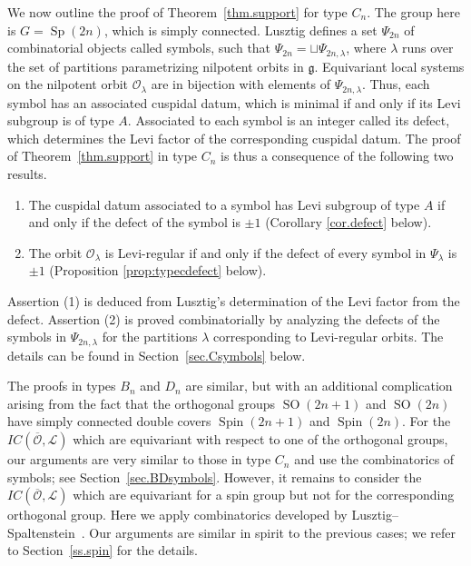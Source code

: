\documentclass[reqno,11pt]{amsart}
\theoremstyle{remark}
\theoremstyle{remark}
\theoremstyle{definition}
\theoremstyle{definition}
\theoremstyle{definition}
\numberwithin{equation}{section}
\newcommand{\SO}{\operatorname{SO}}
\newcommand{\Sp}{\operatorname{Sp}}
\newcommand{\Spin}{\operatorname{Spin}}
\newcommand{\fg}{{\mathfrak g}}
\newcommand{\gl}{\lambda}
\newcommand{\cl}{\mathcal{L}}
\newcommand{\co}{\mathcal{O}}
\begin{document}
We now outline the proof of Theorem~\ref{thm.support} for type $C_n$.
The group here is $G = \Sp(2n)$, which is simply connected. Lusztig defines a set $\Psi_{2n}$ of combinatorial objects called symbols, such that
$\Psi_{2n} = \sqcup \Psi_{2n, \gl}$, where $\gl$ runs over the set of partitions parametrizing nilpotent orbits in $\fg$.  Equivariant local systems on the nilpotent orbit $\co_{\gl}$ are in bijection with elements of $\Psi_{2n, \gl}$.  Thus, each symbol has an associated cuspidal datum,
which is minimal if and only if its Levi subgroup is of type $A$. Associated to each symbol is an integer called its defect, which determines the Levi factor of the corresponding cuspidal datum.  The proof of Theorem~\ref{thm.support} in type $C_n$ is thus a consequence of the following two results.
\begin{enumerate}
\item  The cuspidal datum associated to a symbol has Levi subgroup of type $A$ if and only if the defect of the symbol is $\pm 1$ (Corollary \ref{cor.defect} below).
\item The orbit $\co_{\gl}$ is Levi-regular if and only if the defect of every symbol in $\Psi_{\gl}$ is $\pm 1$  (Proposition \ref{prop:typecdefect} below).
\end{enumerate}
Assertion (1) is deduced from Lusztig's determination of the Levi factor from the defect. 
Assertion (2) is proved combinatorially by analyzing the defects of the symbols in $\Psi_{2n, \gl}$ for the partitions
$\gl$ corresponding to Levi-regular orbits.  The details can be found in Section~\ref{sec.Csymbols} below. 

The proofs in types $B_n$ and $D_n$ are similar, but with an additional complication arising from the fact that the orthogonal
groups $\SO(2n+1)$ and $\SO(2n)$ have simply connected double covers $\Spin(2n+1)$ and $\Spin(2n)$.  For the $IC(\overline{\co}, \cl)$ which 
are equivariant with respect to one of the orthogonal groups, our arguments are very similar to those in type $C_n$ and use the combinatorics of symbols; see Section~\ref{sec.BDsymbols}.  However, it remains to consider the $IC(\overline{\co}, \cl)$ which are equivariant for a spin group but not for the corresponding orthogonal group.  Here we apply combinatorics developed by  Lusztig--Spaltenstein~\cite{LuSpal85}. Our arguments are similar in spirit to the previous cases; we refer to Section~\ref{ss.spin} for the details.
\end{document}
